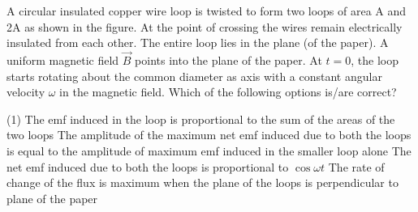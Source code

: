     \item A circular insulated copper wire loop is twisted to form two loops of area A and 2A as shown in the figure. At the point of crossing the wires remain electrically insulated from each other. The entire loop lies in the plane (of the paper). A uniform magnetic field \( \vec{B} \) points into the plane of the paper. At \( t = 0 \), the loop starts rotating about the common diameter as axis with a constant angular velocity \( \omega \) in the magnetic field. Which of the following options is/are correct?\begin{center}
\end{center}
        \begin{tasks}(1)
            \task The emf induced in the loop is proportional to the sum of the areas of the two loops
            \task The amplitude of the maximum net emf induced due to both the loops is equal to the amplitude of maximum emf induced in the smaller loop alone
            \task The net emf induced due to both the loops is proportional to \( \cos \omega t \)
            \task The rate of change of the flux is maximum when the plane of the loops is perpendicular to plane of the paper
        \end{tasks}
